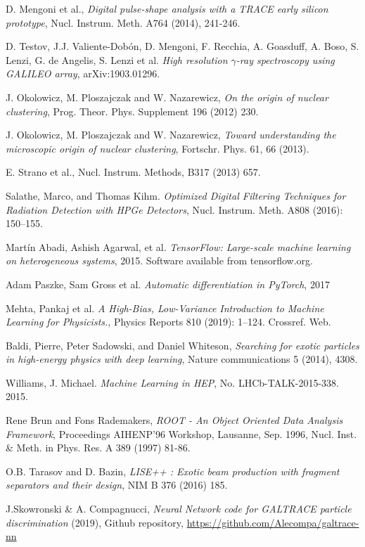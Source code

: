 \begin{thebibliography}{20}

  D. Mengoni et al.,
  \emph{Digital pulse-shape analysis with a TRACE early silicon prototype}, Nucl. Instrum. Meth. A764 (2014), 241-246.

  D. Testov, J.J. Valiente-Dobón, D. Mengoni, F. Recchia, A. Goasduff, A. Boso, S. Lenzi, G. de Angelis, S. Lenzi et al.
  \emph{High resolution $\gamma$-ray spectroscopy using GALILEO array}, arXiv:1903.01296.
  
  J. Okolowicz, M. Ploszajczak and W. Nazarewicz,
  \emph{On the origin of nuclear clustering}, Prog. Theor. Phys. Supplement 196 (2012) 230.

  J. Okolowicz, M. Ploszajczak and W. Nazarewicz,
  \emph{Toward understanding the microscopic origin of nuclear clustering}, Fortschr. Phys. 61, 66 (2013).

  E. Strano et al., Nucl. Instrum. Methods, B317 (2013) 657.
  

Salathe, Marco, and Thomas Kihm. 
\emph{Optimized Digital Filtering Techniques for Radiation Detection with HPGe Detectors}, Nucl. Instrum. Meth. A808 (2016): 150–155.

Martín Abadi, Ashish Agarwal, et al.
\emph{TensorFlow: Large-scale machine learning on heterogeneous systems},
2015. Software available from tensorflow.org.

Adam Paszke, Sam Gross et al.
\emph{Automatic differentiation in PyTorch},
2017

Mehta, Pankaj et al. 
\emph{A High-Bias, Low-Variance Introduction to Machine Learning for Physicists.}, Physics Reports 810 (2019): 1–124. Crossref. Web.

Baldi, Pierre, Peter Sadowski, and Daniel Whiteson, \emph{Searching for exotic particles in high-energy physics with deep learning}, Nature communications 5 (2014), 4308.

  Williams, J. Michael. \emph{Machine Learning in HEP}, No. LHCb-TALK-2015-338. 2015.

  Rene Brun and Fons Rademakers,
  \emph{ROOT - An Object Oriented Data Analysis Framework}, Proceedings AIHENP'96 Workshop, Lausanne, Sep. 1996, Nucl. Inst. \& Meth. in Phys. Res. A 389 (1997) 81-86.

  O.B. Tarasov and D. Bazin,
  \emph{LISE++ : Exotic beam production with fragment separators and their design}, NIM B 376 (2016) 185.

  J.Skowronski \& A. Compagnucci,
  \emph{Neural Network code for GALTRACE particle discrimination} (2019), Github repository, \url{https://github.com/Alecompa/galtrace-nn}

\end{thebibliography}
